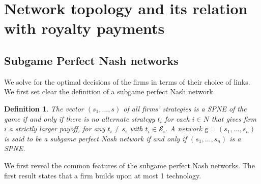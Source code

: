 \documentclass{article}
\newtheorem{definition}{Definition}
\begin{document}
\section{Network topology and its relation with royalty payments}
 \subsection{Subgame Perfect Nash networks}
We solve for the optimal decisions of the firms in terms of their choice of links. We first set clear the definition of a subgame perfect Nash network. \\

\begin{definition}
The vector $(s_1,\ldots,s)$ of all firms' strategies is a SPNE of the game if and only if there is no alternate strategy $t_i$ for each $i\in N$ that gives firm $i$ a strictly larger payoff, for any $t_i\neq s_i$ with $t_i\in \mathcal{S}_i$. A network $\text{g}=(s_1,\ldots, s_n)$ is said to be a subgame perfect Nash network if and only if $(s_1,\ldots, s_n)$ is a SPNE. 
\end{definition}

We first reveal the common features of the subgame perfect Nash networks. The first result states that a firm builds upon at most 1 technology. 
\end{document}
